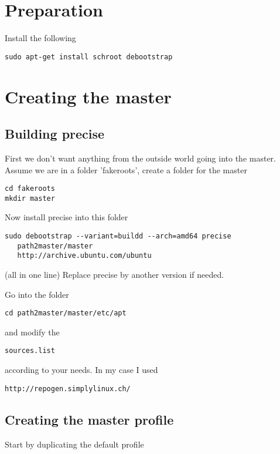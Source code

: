 \documentclass[a4paper]{article}
\begin{document}
\section{Preparation}

Install the following

\begin{verbatim}
sudo apt-get install schroot debootstrap
\end{verbatim}

\section{Creating the master}
\subsection{Building precise}
First we don't want anything from the outside world going into the master.
Assume we are in a folder 'fakeroots', create a folder for the master

\begin{verbatim}
cd fakeroots
mkdir master
\end{verbatim}

Now install precise into this folder

\begin{verbatim}
sudo debootstrap --variant=buildd --arch=amd64 precise 
   path2master/master 
   http://archive.ubuntu.com/ubuntu
\end{verbatim}

(all in one line)
Replace precise by another version if needed.

Go into the folder

\begin{verbatim}
cd path2master/master/etc/apt
\end{verbatim}

and modify the \begin{verbatim}sources.list\end{verbatim} according to your needs. In my case I used

\begin{verbatim}
http://repogen.simplylinux.ch/
\end{verbatim}

\subsection{Creating the master profile}

Start by duplicating the default profile
\end{document}
